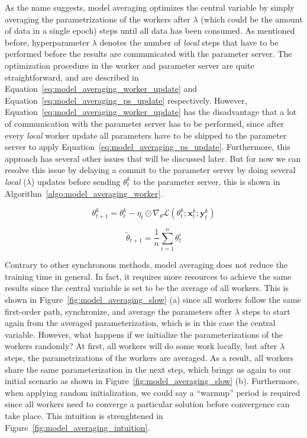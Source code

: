 As the name suggests, model averaging optimizes the central variable by simply averaging the parametrizations of the workers after $\lambda$ (which could be the amount of data in a single epoch) steps until all data has been consumed. As mentioned before, hyperparameter $\lambda$ denotes the number of \emph{local} steps that have to be performed before the results are communicated with the parameter server. The optimization procedure in the worker and parameter server are quite straightforward, and are described in Equation~\ref{eq:model_averaging_worker_update} and Equation~\ref{eq:model_averaging_ps_update} respectively. However, Equation~\ref{eq:model_averaging_worker_update} has the disadvantage that a lot of communication with the parameter server has to be performed, since after every \emph{local} worker update all parameters have to be shipped to the parameter server to apply Equation~\ref{eq:model_averaging_ps_update}. Furthermore, this approach has several other issues that will be discussed later. But for now we can resolve this issue by delaying a commit to the parameter server by doing several \emph{local} ($\lambda$) updates before sending $\theta^k_t$ to the parameter server, this is shown in Algorithm~\ref{algo:model_averaging_worker}.

\begin{equation}
  \label{eq:model_averaging_worker_update}
  \theta^k_{t+1} = \theta^k_t - \eta_t \odot \nabla_\theta \mathcal{L}(\theta^k_t;\textbf{x}^k_t;\textbf{y}^k_t)
\end{equation}

\begin{equation}
  \label{eq:model_averaging_ps_update}
  \tilde{\theta}_{t+1} = \frac{1}{n}\sum^n_{i=1} \theta^i_t
\end{equation}

Contrary to other synchronous methods, model averaging does not reduce the training time in general. In fact, it requires more resources to achieve the same results since the central variable is set to be the average of all workers. This is shown in Figure~\ref{fig:model_averaging_slow} (a) since all workers follow the same first-order path, synchronize, and average the parameters after $\lambda$ steps to start again from the averaged parameterization, which is in this case the central variable. However, what happens if we initialize the parameterizations of the workers randomly? At first, all workers will do some work locally, but after $\lambda$ steps, the parametrizations of the workers are averaged. As a result, all workers share the same parameterization in the next step, which brings us again to our initial scenario as shown in Figure~\ref{fig:model_averaging_slow} (b). Furthermore, when applying random initialization, we could say a ``warmup'' period is required since all workers need to converge a particular solution before convergence can take place. This intuition is strenghtened in Figure~\ref{fig:model_averaging_intuition}.

